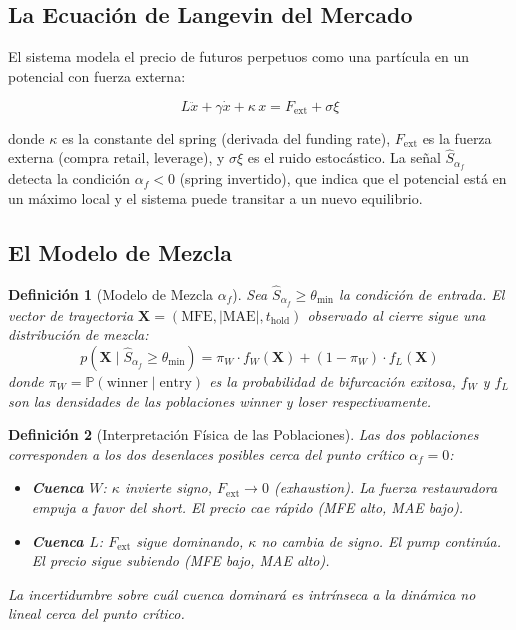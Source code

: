 \documentclass[11pt,a4paper]{article}
\newtheorem{definition}{Definici\'on}[section]
\newcommand{\Prob}{\mathbb{P}}
\newcommand{\af}{\alpha_f}
\newcommand{\score}{\hat{S}_{\af}}
\begin{document}
\subsection{La Ecuaci\'on de Langevin del Mercado}

El sistema modela el precio de futuros perpetuos como una part\'icula
en un potencial con fuerza externa:

\begin{equation}
L\ddot{x} + \gamma\dot{x} + \kappa\,x = F_{\text{ext}} + \sigma\xi
\label{eq:langevin}
\end{equation}

donde $\kappa$ es la constante del spring (derivada del funding rate),
$F_{\text{ext}}$ es la fuerza externa (compra retail, leverage),
y $\sigma\xi$ es el ruido estoc\'astico. La se\~nal $\score$ detecta
la condici\'on $\af < 0$ (spring invertido), que indica que el
potencial est\'a en un m\'aximo local y el sistema puede transitar
a un nuevo equilibrio.

\subsection{El Modelo de Mezcla}

\begin{definition}[Modelo de Mezcla $\af$]
\label{def:mixture}
Sea $\score \geq \theta_{\min}$ la condici\'on de entrada. El vector
de trayectoria $\bm{X} = (\text{MFE}, |\text{MAE}|, t_{\text{hold}})$
observado al cierre sigue una distribuci\'on de mezcla:
\begin{equation}
p(\bm{X} \mid \score \geq \theta_{\min}) =
  \pi_W \cdot f_W(\bm{X}) + (1 - \pi_W) \cdot f_L(\bm{X})
\label{eq:mixture}
\end{equation}
donde $\pi_W = \Prob(\text{winner} \mid \text{entry})$ es la
probabilidad de bifurcaci\'on exitosa, $f_W$ y $f_L$ son las
densidades de las poblaciones winner y loser respectivamente.
\end{definition}

\begin{definition}[Interpretaci\'on F\'isica de las Poblaciones]
Las dos poblaciones corresponden a los dos desenlaces posibles
cerca del punto cr\'itico $\af = 0$:
\begin{itemize}[leftmargin=1.5em]
\item \textbf{Cuenca $W$}: $\kappa$ invierte signo, $F_{\text{ext}} \to 0$
  (exhaustion). La fuerza restauradora empuja a favor del short.
  El precio cae r\'apido (MFE alto, MAE bajo).
\item \textbf{Cuenca $L$}: $F_{\text{ext}}$ sigue dominando, $\kappa$
  no cambia de signo. El pump contin\'ua. El precio sigue subiendo
  (MFE bajo, MAE alto).
\end{itemize}
La incertidumbre sobre cu\'al cuenca dominar\'a es intr\'inseca a la
din\'amica no lineal cerca del punto cr\'itico.
\end{definition}
\end{document}
